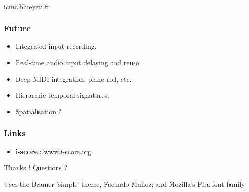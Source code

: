 \documentclass{beamer}
\begin{document}
\begin{frame}
    \Huge
    ~\\\vspace{1cm}
    \url{icmc.blueyeti.fr}
\end{frame}

\begin{frame}
	\frametitle{Future} 
	\Large
	\begin{itemize}
		\item<1> Integrated input recording.
		\item<2> Real-time audio input delaying and reuse.
		\item<3> Deep MIDI integration, piano roll, etc.
		\item<4> Hierarchic temporal signatures.
        \item<5> Spatialisation ?
		
	\end{itemize}
\end{frame}    


\begin{frame}[allowframebreaks]%
    
    
    
    {\footnotesize
        \nocite{*}
        
        
    }
\end{frame}

\begin{frame}
    \frametitle{Links} 
    \Large
    \begin{itemize}
        \setlength\itemsep{1em}
        \item \textbf{i-score} : \url{www.i-score.org}
    \end{itemize}
        
    \centering
    \vspace{2em}
    \Large{Thanks ! Questions ?}
    \vspace{2em}
    
    \tiny{Uses the Beamer 'simple' theme, Facundo Muñoz; and Mozilla's Fira font family}
\end{frame}
\end{document}
